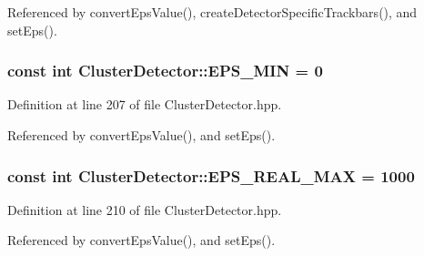 \-Referenced by convert\-Eps\-Value(), create\-Detector\-Specific\-Trackbars(), and set\-Eps().

\hypertarget{classmultiscale_1_1analysis_1_1ClusterDetector_a6c3517e03d1fd2c6b4d6cd0d81eb8684}{
\subsubsection[{\-E\-P\-S\-\_\-\-M\-I\-N}]{\setlength{\rightskip}{0pt plus 5cm}const int {\bf \-Cluster\-Detector\-::\-E\-P\-S\-\_\-\-M\-I\-N} = 0}}\label{classmultiscale_1_1analysis_1_1ClusterDetector_a6c3517e03d1fd2c6b4d6cd0d81eb8684}


\-Definition at line 207 of file \-Cluster\-Detector.\-hpp.



\-Referenced by convert\-Eps\-Value(), and set\-Eps().

\hypertarget{classmultiscale_1_1analysis_1_1ClusterDetector_a3e60b9e068a8addf9dd27382c74e6d62}{
\subsubsection[{\-E\-P\-S\-\_\-\-R\-E\-A\-L\-\_\-\-M\-A\-X}]{\setlength{\rightskip}{0pt plus 5cm}const int {\bf \-Cluster\-Detector\-::\-E\-P\-S\-\_\-\-R\-E\-A\-L\-\_\-\-M\-A\-X} = 1000}}\label{classmultiscale_1_1analysis_1_1ClusterDetector_a3e60b9e068a8addf9dd27382c74e6d62}


\-Definition at line 210 of file \-Cluster\-Detector.\-hpp.



\-Referenced by convert\-Eps\-Value(), and set\-Eps().


